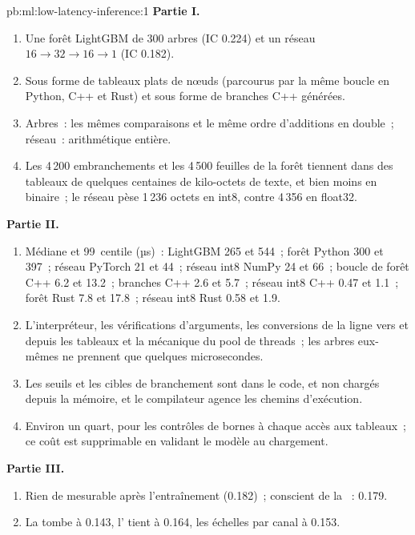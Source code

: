 \begin{solution}{pb:ml:low-latency-inference:1}
\textbf{Partie I.}
\begin{enumerate}
\item Une forêt LightGBM de 300 arbres (IC 0.224) et un réseau $16\to32\to16\to1$ (IC 0.182).
\item Sous forme de tableaux plats de nœuds (parcourus par la même boucle en Python, C++ et Rust) et sous forme de branches C++ générées.
\item Arbres~: les mêmes comparaisons et le même ordre d'additions en double~; réseau~: arithmétique entière.
\item Les 4\,200 embranchements et les 4\,500 feuilles de la forêt tiennent dans des tableaux de quelques centaines de kilo-octets de texte, et bien moins en binaire~; le
réseau pèse 1\,236 octets en int8, contre 4\,356 en float32.
\end{enumerate}
\textbf{Partie II.}
\begin{enumerate}[resume]
\item Médiane et 99~centile (µs)~: LightGBM 265 et 544~; forêt Python 300 et 397~; réseau PyTorch 21 et 44~; réseau int8 NumPy
24 et 66~; boucle de forêt C++ 6.2 et 13.2~; branches C++ 2.6 et 5.7~; réseau int8 C++ 0.47 et 1.1~; forêt Rust 7.8
et 17.8~; réseau int8 Rust 0.58 et 1.9.
\item L'interpréteur, les vérifications d'arguments, les conversions de la ligne vers et depuis les tableaux et la mécanique du pool de threads~; les arbres
eux-mêmes ne prennent que quelques microsecondes.
\item Les seuils et les cibles de branchement sont dans le code, et non chargés depuis la mémoire, et le compilateur agence les chemins d'exécution.
\item Environ un quart, pour les contrôles de bornes à chaque accès aux tableaux~; ce coût est supprimable en validant le modèle au chargement.
\end{enumerate}
\textbf{Partie III.}
\begin{enumerate}[resume]
\item Rien de mesurable après l'entraînement (0.182)~;  conscient de la ~: 0.179.
\item La  tombe à 0.143, l' tient à 0.164, les échelles par canal à 0.153.

\end{enumerate}
\end{solution}
